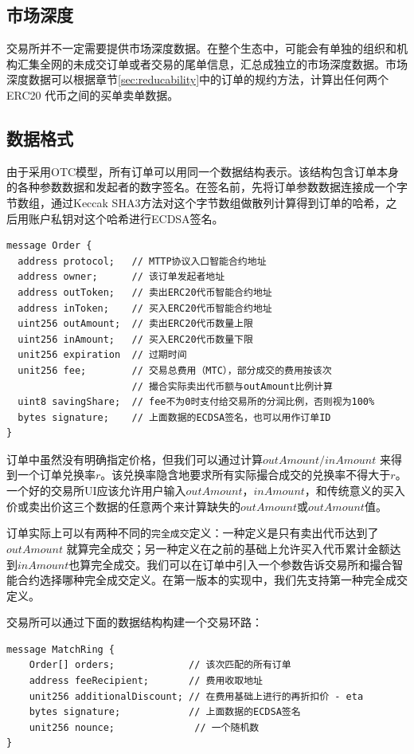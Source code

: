 \documentclass[UTF8,nofonts]{ctexart}
\begin{document}
\subsection{市场深度\label{sec:marketdepth}}

交易所并不一定需要提供市场深度数据。在整个生态中，可能会有单独的组织和机构汇集全网的未成交订单或者交易的尾单信息，汇总成独立的市场深度数据。市场深度数据可以根据章节\ref{sec:reducability}中的订单的规约方法，计算出任何两个ERC20 代币之间的买单卖单数据。

\subsection{数据格式\label{sec:dataformat}}

由于采用OTC模型，所有订单可以用同一个数据结构表示。该结构包含订单本身的各种参数数据和发起者的数字签名。在签名前，先将订单参数数据连接成一个字节数组，通过Keccak SHA3方法对这个字节数组做散列计算得到订单的哈希，之后用账户私钥对这个哈希进行ECDSA签名。


\begin{verbatim}
message Order {
  address protocol;   // MTTP协议入口智能合约地址
  address owner;      // 该订单发起者地址
  address outToken;   // 卖出ERC20代币智能合约地址
  address inToken;    // 买入ERC20代币智能合约地址
  uint256 outAmount;  // 卖出ERC20代币数量上限
  uint256 inAmount;   // 买入ERC20代币数量下限
  unit256 expiration  // 过期时间
  unit256 fee;        // 交易总费用（MTC），部分成交的费用按该次
                      // 撮合实际卖出代币额与outAmount比例计算
  uint8 savingShare;  // fee不为0时支付给交易所的分润比例，否则视为100%
  bytes signature;    // 上面数据的ECDSA签名，也可以用作订单ID
}
\end{verbatim}

订单中虽然没有明确指定价格，但我们可以通过计算$outAmount / inAmount$ 来得到一个订单兑换率$r$。该兑换率隐含地要求所有实际撮合成交的兑换率不得大于$r$。 一个好的交易所UI应该允许用户输入$outAmount$，$inAmount$，和传统意义的买入价或卖出价这三个数据的任意两个来计算缺失的$outAmount$或$outAmount$值。

订单实际上可以有两种不同的\texttt{完全成交}定义：一种定义是只有卖出代币达到了$outAmount$ 就算完全成交；另一种定义在之前的基础上允许买入代币累计金额达到$inAmount$也算完全成交。我们可以在订单中引入一个参数告诉交易所和撮合智能合约选择哪种完全成交定义。在第一版本的实现中，我们先支持第一种完全成交定义。


交易所可以通过下面的数据结构构建一个交易环路：
\begin{verbatim}
message MatchRing {
    Order[] orders;             // 该次匹配的所有订单
    address feeRecipient;       // 费用收取地址
    unit256 additionalDiscount; // 在费用基础上进行的再折扣价 - eta
    bytes signature;            // 上面数据的ECDSA签名
    unit256 nounce;              // 一个随机数
}
\end{verbatim}
\end{document}
